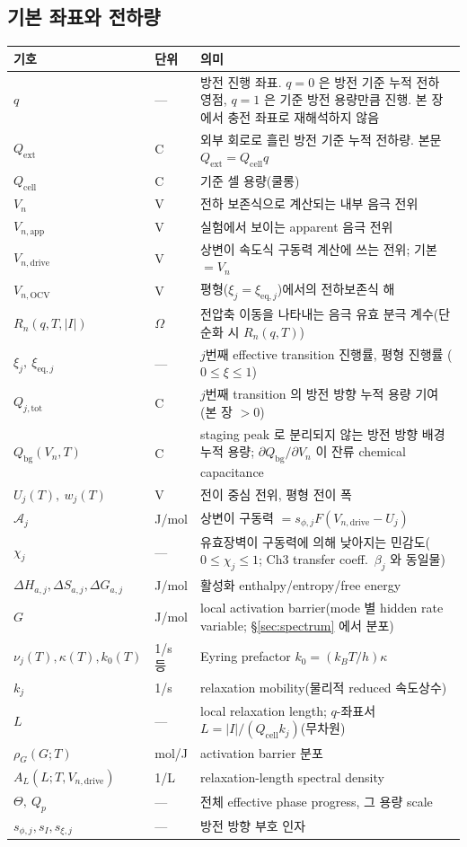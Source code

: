 \documentclass[11pt,a4paper]{article}
\newcommand{\eq}{\mathrm{eq}}
\newcommand{\app}{\mathrm{app}}
\newcommand{\drive}{\mathrm{drive}}
\newcommand{\tot}{\mathrm{tot}}
\newcommand{\bg}{\mathrm{bg}}
\newcommand{\cell}{\mathrm{cell}}
\newcommand{\ext}{\mathrm{ext}}
\newcommand{\OCV}{\mathrm{OCV}}
\begin{document}
\subsection{기본 좌표와 전하량}
\begin{longtable}{p{} p{} p{}}
\toprule 기호 & 단위 & 의미 \\ \midrule \endhead
$q$ & --- & 방전 진행 좌표. $q=0$ 은 방전 기준 누적 전하 영점, $q=1$ 은 기준 방전 용량만큼 진행. 본 장에서 충전 좌표로 재해석하지 않음 \\
$Q_\ext$ & C & 외부 회로로 흘린 방전 기준 누적 전하량. 본문 $Q_\ext=Q_\cell q$ \\
$Q_\cell$ & C & 기준 셀 용량(쿨롱) \\
$V_n$ & V & 전하 보존식으로 계산되는 내부 음극 전위 \\
$V_{n,\app}$ & V & 실험에서 보이는 apparent 음극 전위 \\
$V_{n,\drive}$ & V & 상변이 속도식 구동력 계산에 쓰는 전위; 기본 $=V_n$ \\
$V_{n,\OCV}$ & V & 평형($\xi_j=\xi_{\eq,j}$)에서의 전하보존식 해 \\
$R_n(q,T,|I|)$ & $\Omega$ & 전압축 이동을 나타내는 음극 유효 분극 계수(단순화 시 $R_n(q,T)$) \\
$\xi_j,\ \xi_{\eq,j}$ & --- & $j$번째 effective transition 진행률, 평형 진행률 ($0\!\le\!\xi\!\le\!1$) \\
$Q_{j,\tot}$ & C & $j$번째 transition 의 방전 방향 누적 용량 기여(본 장 $>0$) \\
$Q_\bg(V_n,T)$ & C & staging peak 로 분리되지 않는 방전 방향 배경 누적 용량; $\partial Q_\bg/\partial V_n$ 이 잔류 chemical capacitance \\
$U_j(T),\ w_j(T)$ & V & 전이 중심 전위, 평형 전이 폭 \\
$\mathcal A_j$ & J/mol & 상변이 구동력 $=s_{\phi,j}F(V_{n,\drive}-U_j)$ \\
$\chi_j$ & --- & 유효장벽이 구동력에 의해 낮아지는 민감도($0\le\chi_j\le1$; Ch3 transfer coeff.\ $\beta_j$ 와 동일물) \\
$\Delta H_{a,j},\Delta S_{a,j},\Delta G_{a,j}$ & J/mol & 활성화 enthalpy/entropy/free energy \\
$G$ & J/mol & local activation barrier(mode 별 hidden rate variable; \S\ref{sec:spectrum} 에서 분포) \\
$\nu_j(T),\kappa(T),k_0(T)$ & 1/s 등 & Eyring prefactor $k_0=(k_BT/h)\kappa$ \\
$k_j$ & 1/s & relaxation mobility(물리적 reduced 속도상수) \\
$L$ & --- & local relaxation length; $q$-좌표서 $L=|I|/(Q_\cell k_j)$(무차원) \\
$\rho_G(G;T)$ & mol/J & activation barrier 분포 \\
$A_L(L;T,V_{n,\drive})$ & 1/L & relaxation-length spectral density \\
$\Theta,\ Q_p$ & --- & 전체 effective phase progress, 그 용량 scale \\
$s_{\phi,j},s_I,s_{\xi,j}$ & --- & 방전 방향 부호 인자 \\
\bottomrule
\end{longtable}
\end{document}
